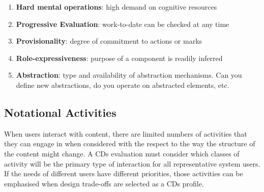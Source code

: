 \documentclass{article}
\begin{document}
\begin{enumerate}
    \item \textbf{Hard mental operations}: high demand on cognitive resources
    
    \item \textbf{Progressive Evaluation}: work-to-date can be checked at any time
    
    \item \textbf{Provisionality}: degree of commitment to actions or marks
    
    \item \textbf{Role-expressiveness}: purpose of a component is readily inferred
    
    \item \textbf{Abstraction}: type and availability of abstraction mechanisms. Can you define new abstractions, do you operate on abstracted elements, etc. 
\end{enumerate}

\subsection{Notational Activities}
When users interact with content, there are limited numbers of activities that they can engage in when considered with the respect to the way the structure of the content might change. A CDs evaluation must consider which classes of activity will be the primary type of interaction for all representative system users. If the needs of different users have different priorities, those activities can be emphasised when design trade-offs are selected as a CDs profile. 
\end{document}
